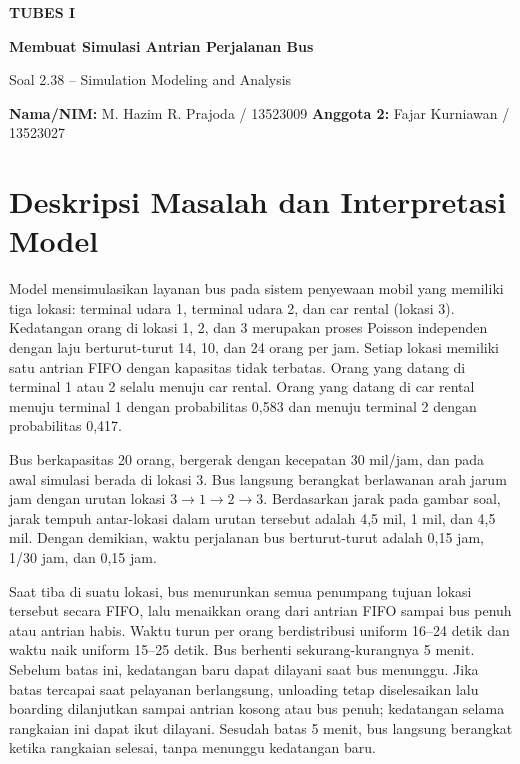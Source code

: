 \documentclass[a4paper,10pt]{article}
\begin{document}
\begin{center}
  {\Large\bfseries TUBES I}\par\vspace{3pt}
  {\large\bfseries Membuat Simulasi Antrian Perjalanan Bus}\par\vspace{5pt}
  {\normalsize Soal 2.38 -- Simulation Modeling and Analysis}\par
\end{center}

\noindent\textbf{Nama/NIM:} M. Hazim R. Prajoda / 13523009\hfill
\textbf{Anggota 2:} Fajar Kurniawan / 13523027

\vspace{8pt}
\section*{Deskripsi Masalah dan Interpretasi Model}

\begin{center}
  \resizebox{0.7\linewidth}{!}{}
\end{center}



Model mensimulasikan layanan bus pada sistem penyewaan mobil yang memiliki tiga lokasi: terminal udara 1, terminal udara 2, dan car rental (lokasi 3). Kedatangan orang di lokasi 1, 2, dan 3 merupakan proses Poisson independen dengan laju berturut-turut 14, 10, dan 24 orang per jam. Setiap lokasi memiliki satu antrian FIFO dengan kapasitas tidak terbatas. Orang yang datang di terminal 1 atau 2 selalu menuju car rental. Orang yang datang di car rental menuju terminal 1 dengan probabilitas 0,583 dan menuju terminal 2 dengan probabilitas 0,417.

Bus berkapasitas 20 orang, bergerak dengan kecepatan 30 mil/jam, dan pada awal simulasi berada di lokasi 3. Bus langsung berangkat berlawanan arah jarum jam dengan urutan lokasi $3\rightarrow1\rightarrow2\rightarrow3$. Berdasarkan jarak pada gambar soal, jarak tempuh antar-lokasi dalam urutan tersebut adalah 4,5 mil, 1 mil, dan 4,5 mil. Dengan demikian, waktu perjalanan bus berturut-turut adalah 0,15 jam, 1/30 jam, dan 0,15 jam.

Saat tiba di suatu lokasi, bus menurunkan semua penumpang tujuan lokasi tersebut secara FIFO, lalu menaikkan orang dari antrian FIFO sampai bus penuh atau antrian habis. Waktu turun per orang berdistribusi uniform 16--24 detik dan waktu naik uniform 15--25 detik. Bus berhenti sekurang-kurangnya 5 menit. Sebelum batas ini, kedatangan baru dapat dilayani saat bus menunggu. Jika batas tercapai saat pelayanan berlangsung, unloading tetap diselesaikan lalu boarding dilanjutkan sampai antrian kosong atau bus penuh; kedatangan selama rangkaian ini dapat ikut dilayani. Sesudah batas 5 menit, bus langsung berangkat ketika rangkaian selesai, tanpa menunggu kedatangan baru.
\end{document}

